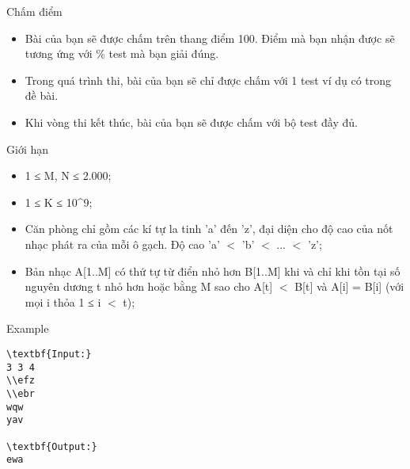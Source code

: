 Chấm điểm
\begin{itemize}
	\item     Bài của bạn sẽ được chấm trên thang điểm 100. Điểm mà bạn nhận được sẽ tương ứng với \% test mà bạn giải đúng.   
	\item     Trong quá trình thi, bài của bạn sẽ chỉ được chấm với 1 test ví dụ có trong đề bài.   
	\item     Khi vòng thi kết thúc, bài của bạn sẽ được chấm với bộ test đầy đủ.   
\end{itemize}
Giới hạn
\begin{itemize}
	\item     1 ≤ M, N ≤ 2.000;   
	\item     1 ≤ K ≤ 10^9;   
	\item     Căn phòng chỉ gồm các kí tự la tinh 'a' đến 'z', đại diện cho độ cao của nốt nhạc phát ra của mỗi ô gạch. Độ cao 'a' $<$ 'b' $<$ ... $<$ 'z';   
	\item     Bản nhạc A[1..M] có thứ tự từ điển nhỏ hơn B[1..M] khi và chỉ khi tồn tại số nguyên dương t nhỏ hơn hoặc bằng M sao cho A[t] $<$ B[t] và A[i] = B[i] (với mọi i thỏa 1 ≤ i $<$ t);   
\end{itemize}
\begin{itemize}
\end{itemize}
Example
\begin{verbatim}
\textbf{Input:}
3 3 4
\\efz
\\ebr
wqw
yav

\textbf{Output:}
ewa
\end{verbatim}